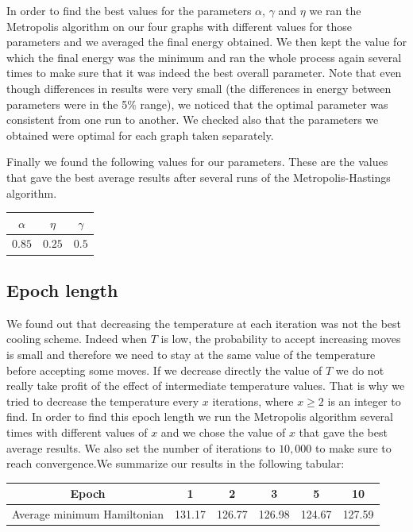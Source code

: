\documentclass[a4paper]{article}
\begin{document}
In order to find the best values for the parameters $\alpha$, $\gamma$ and $\eta$ we ran the Metropolis algorithm on our four graphs with different values for those parameters and we averaged the final energy obtained. We then kept the value for which the final energy was the minimum and ran the whole process again several times to make sure that it was indeed the best overall parameter. Note that even though differences in results were very small (the differences in energy between parameters were in the 5\% range), we noticed that the optimal parameter was consistent from one run to another. We checked also that the parameters we obtained were optimal for each graph taken separately.

Finally we found the following values for our parameters. These are the values that gave the best average results after several runs of the Metropolis-Hastings algorithm.

\begin{center}
\begin{tabular}{|c|c|c|}
\hline 
$\alpha$ & $\eta$ & $\gamma$ \\ 
\hline 
$0.85$ & $0.25$ & $0.5$ \\ 
\hline 
\end{tabular} 
\end{center}

\subsection{Epoch length}

We found out that decreasing the temperature at each iteration was not the best cooling scheme. Indeed when $T$ is low, the probability to accept increasing moves is small and therefore we need to stay at the same value of the temperature before accepting some moves. If we decrease directly the value of $T$ we do not really take profit of the effect of intermediate temperature values. That is why we tried to decrease the temperature every $x$ iterations, where $x \geqslant 2$ is an integer to find. In order to find this epoch length we run the Metropolis algorithm several times with different values of $x$ and we chose the value of $x$ that gave the best average results. We also set the number of iterations to $10,000$ to make sure to reach convergence.We summarize our results in the following tabular:
\begin{center}
\begin{tabular}{| c || c | c| c| c| c|}
\hline
Epoch & 1 & 2 & 3 & 5 & 10\\
\hline
Average minimum Hamiltonian & 131.17 & 126.77 & 126.98 & 124.67 & 127.59\\
\hline
\end{tabular}
\end{center}
\end{document}

